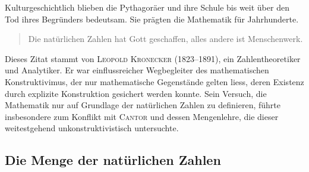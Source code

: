 \documentclass[%
11pt,%
twoside,%
titlepage,%
german,%
headsepline%
]{scrartcl}
\begin{document}
Kulturgeschichtlich blieben die Pythagoräer und ihre Schule bis weit über den Tod ihres Begründers bedeutsam. Sie prägten die Mathematik für Jahrhunderte.

\begin{quote}
Die natürlichen Zahlen hat Gott geschaffen, alles andere ist Menschenwerk.
\end{quote}
Dieses Zitat stammt von  \textsc{Leopold Kronecker} (1823--1891), ein Zahlentheoretiker und Analytiker. Er war einflussreicher Wegbegleiter des mathematischen Konstruktivimus, der nur mathematische Gegenstände gelten liess, deren Existenz durch explizite Konstruktion gesichert werden konnte. Sein Versuch, die Mathematik nur auf Grundlage der natürlichen Zahlen zu definieren, führte insbesondere zum Konflikt mit \textsc{Cantor} und dessen Mengenlehre, die dieser weitestgehend unkonstruktivistisch untersuchte.

\subsection{Die Menge der natürlichen Zahlen}
\end{document}
